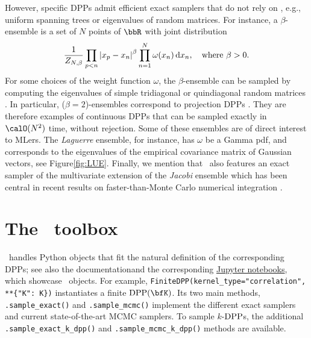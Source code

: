 \documentclass[twoside,11pt]{article}
\begin{document}
        However, specific DPPs admit efficient exact samplers that do not rely on , e.g., uniform spanning trees \citep[UST,][Figure~\ref{fig:UST_kernel}]{PrWi98} or eigenvalues of random matrices.
        For instance, a $\beta$-ensemble is a set of $N$ points of $\bbR$ with joint distribution
        \begin{equation*}
        \setlength{\belowdisplayskip}{0pt}
        \setlength{\belowdisplayshortskip}{0pt}
        \setlength{\abovedisplayskip}{0pt}
        \setlength{\abovedisplayshortskip}{0pt}
        \label{eq:beta_ensemble_pdf}
        \frac{1}{Z_{N,\beta}}
        \prod_{p< n}
            \lrabs{x_p-x_n}^{\beta}
        \prod_{n= 1}^N
            \omega(x_n)
            \diff x_n, \quad \text{where } \beta>0.
        \end{equation*}
        For some choices of the weight function $\omega$, the $\beta$-ensemble can be sampled by computing the eigenvalues of simple tridiagonal \citep{DuEd02} or quindiagonal random matrices \citep{KiNe04}.
        In particular, ($\beta=2$)-ensembles correspond to projection DPPs \citep{Kon05}.
        They are therefore examples of continuous DPPs that can be sampled exactly in $\calO(N^2)$ time, without rejection.
        Some of these ensembles are of direct interest to MLers.
        The \emph{Laguerre} ensemble, for instance, has $\omega$ be a Gamma pdf, and corresponds to the eigenvalues of the empirical covariance matrix of \iid Gaussian vectors, see Figure\ref{fig:LUE}.
        Finally, we mention that \DPPy\ also features an exact sampler of the  multivariate extension of the \emph{Jacobi} ensemble which has been central in recent results on faster-than-Monte Carlo numerical integration \citep{BaHa16,GaBaVa19,MaCoAm19}.



\section{The \DPPy\ toolbox} %
\label{sec:the_dppy_toolbox}

    \lstset{language=mypython}

    \DPPy\ handles Python objects that fit the natural definition of the corresponding DPPs; see also the documentationand the corresponding \href{https://github.com/guilgautier/DPPy/tree/master/notebooks}{Jupyter notebooks}, which showcase \DPPy\ objects.
    For example, \lstinline!FiniteDPP(kernel_type="correlation", **{"K": K})!\!
    instantiates a finite $\DPP(\bfK)$.
    Its two main methods,
    \lstinline{.sample_exact()} and
    \lstinline{.sample_mcmc()}
    implement the different exact samplers and current state-of-the-art MCMC samplers.
    To sample $k$-$\operatorname{DPP}$s, the additional
    \lstinline{.sample_exact_k_dpp()} and
    \lstinline{.sample_mcmc_k_dpp()} methods are available.
\end{document}
